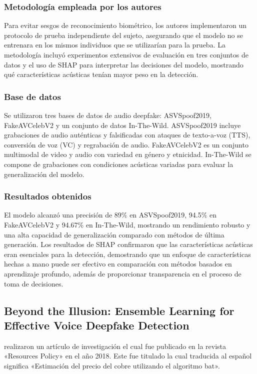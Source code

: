 \subsubsection{Metodología empleada por los autores}
Para evitar sesgos de reconocimiento biométrico, los autores implementaron un protocolo de prueba independiente del sujeto, asegurando que el modelo no se entrenara en los mismos individuos que se utilizarían para la prueba. La metodología incluyó experimentos extensivos de evaluación en tres conjuntos de datos y el uso de SHAP para interpretar las decisiones del modelo, mostrando qué características acústicas tenían mayor peso en la detección.

\subsubsection{Base de datos}
Se utilizaron tres bases de datos de audio deepfake: ASVSpoof2019, FakeAVCelebV2 y un conjunto de datos In-The-Wild. ASVSpoof2019 incluye grabaciones de audio auténticas y falsificadas con ataques de texto-a-voz (TTS), conversión de voz (VC) y regrabación de audio. FakeAVCelebV2 es un conjunto multimodal de video y audio con variedad en género y etnicidad. In-The-Wild se compone de grabaciones con condiciones acústicas variadas para evaluar la generalización del modelo.

\subsubsection{Resultados obtenidos}
El modelo alcanzó una precisión de 89\% en ASVSpoof2019, 94.5\% en FakeAVCelebV2 y 94.67\% en In-The-Wild, mostrando un rendimiento robusto y una alta capacidad de generalización comparado con métodos de última generación. Los resultados de SHAP confirmaron que las características acústicas eran esenciales para la detección, demostrando que un enfoque de características hechas a mano puede ser efectivo en comparación con métodos basados en aprendizaje profundo, además de proporcionar transparencia en el proceso de toma de decisiones.

\subsection{Beyond the Illusion: Ensemble Learning for Effective Voice Deepfake Detection \citep*{pr_dehghani2018copper}}
\citeauthor{pr_dehghani2018copper} realizaron un artículo de investigación el cual fue publicado en la revista «Resources Policy» en el año 2018. Este fue titulado  la cual traducida al español significa «Estimación del precio del cobre utilizando el algoritmo bat».

